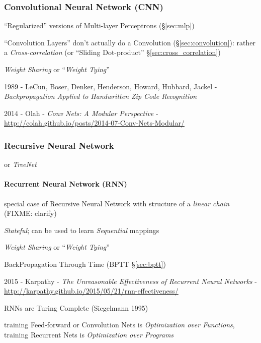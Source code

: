 \subsubsection{Convolutional Neural Network (CNN)}\label{sec:cnn}

``Regularized'' versions of Multi-layer Perceptrons (\S\ref{sec:mlp})

``Convolution Layers'' don't actually do a Convolution
(\S\ref{sec:convolution}):
rather a \emph{Cross-correlation} (or ``Sliding Dot-product''
\S\ref{sec:cross_correlation})

\emph{Weight Sharing} or ``\emph{Weight Tying}''

1989 - LeCun, Boser, Denker, Henderson, Howard, Hubbard, Jackel -
  \emph{Backpropagation Applied to Handwritten Zip Code Recognition}

2014 - Olah - \emph{Conv Nets: A Modular Perspective} -
  \url{http://colah.github.io/posts/2014-07-Conv-Nets-Modular/}



\subsubsection{Recursive Neural Network}\label{sec:recursive_nn}

or \emph{TreeNet}



\paragraph{Recurrent Neural Network (RNN)}\label{sec:rnn}\hfill

special case of Recursive Neural Network with structure of a \emph{linear chain}
(FIXME: clarify)

\emph{Stateful}; can be used to learn \emph{Sequential} mappings

\emph{Weight Sharing} or ``\emph{Weight Tying}''

BackPropagation Through Time (BPTT \S\ref{sec:bptt})

\asterism

2015 - Karpathy - \emph{The Unreasonable Effectiveness of Recurrent Neural
  Networks} -
\url{http://karpathy.github.io/2015/05/21/rnn-effectiveness/}

RNNs are Turing Complete (Siegelmann 1995)

training Feed-forward or Convolution Nets is \emph{Optimization over
  Functions}, training Recurrent Nets is \emph{Optimization over Programs}

